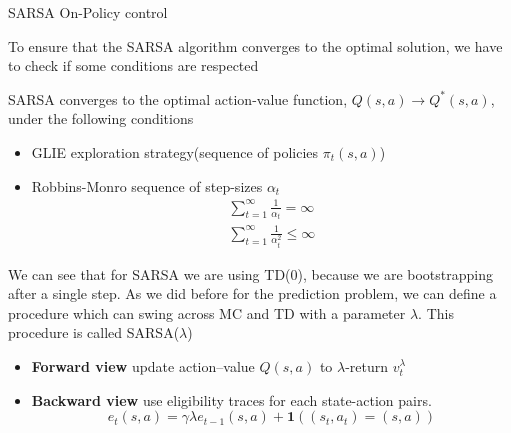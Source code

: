\documentclass[main.tex]{subfiles}
\begin{document}
\begin{algorithm}[H]
\SetAlgoLined
{}


\caption{SARSA On-Policy control}
\end{algorithm}
\par
\noindent
To ensure that the SARSA algorithm converges to the optimal solution, we have to check if some conditions are respected
\newpage
\begin{theorem}
SARSA converges to the optimal action-value function, $Q(s,a) \rightarrow Q^*(s,a)$, under the following conditions
\begin{itemize}
    \item GLIE exploration strategy(sequence of policies $\pi_t(s,a)$)
    \item Robbins-Monro sequence of step-sizes $\alpha_t$
    \begin{gather*}
        \sum_{t=1}^{\infty} \frac{1}{\alpha_t} = \infty \\
        \sum_{t=1}^{\infty} \frac{1}{\alpha_t^2} \leq \infty
    \end{gather*}
\end{itemize}
\end{theorem}
We can see that for SARSA we are using TD(0), because we are bootstrapping after a single step. As we did before for the prediction problem, we can define a procedure which can swing across MC and TD with a parameter $\lambda$. This procedure is called SARSA($\lambda$)
\begin{itemize}
    \item \textbf{Forward view} update action–value $Q(s,a)$ to $\lambda$-return $v_t^{\lambda}$
    \item \textbf{Backward view} use eligibility traces for each state-action pairs.
    \begin{equation*}
        e_t(s,a) = \gamma \lambda e_{t-1}(s,a) + \mathbf{1}((s_t,a_t) = (s,a))
    \end{equation*}
\end{itemize}
\end{document}
